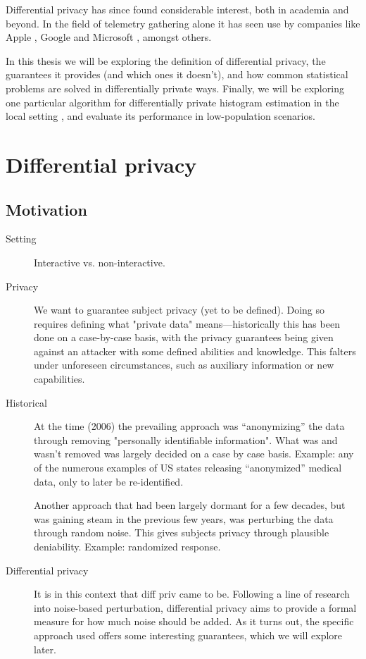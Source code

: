 \documentclass[12pt]{article}
\begin{document}
Differential privacy has since found considerable interest, both in academia and beyond. In the field of telemetry gathering alone it has seen use by companies like Apple \cite{apple_differential}, Google \cite{google_rappor,google_prochlo} and Microsoft \cite{dworketal2006,microsoft_telemetry}, amongst others.

\bigskip

In this thesis we will be exploring the definition of differential privacy, the guarantees it provides (and which ones it doesn't), and how common statistical problems are solved in differentially private ways. Finally, we will be exploring one particular algorithm for differentially private histogram estimation in the local setting \cite{microsoft_telemetry}, and evaluate its performance in low-population scenarios.

\section{Differential privacy \label{sec:diffpriv}}

\subsection{Motivation}

\begin{description}
    \item[Setting] Interactive vs. non-interactive.

    \item[Privacy] We want to guarantee subject privacy (yet to be defined). Doing so requires defining what "private data" means---historically this has been done on a case-by-case basis, with the privacy guarantees being given against an attacker with some defined abilities and knowledge. This falters under unforeseen circumstances, such as auxiliary information or new capabilities.
    
    \item[Historical] At the time (2006) the prevailing approach was ``anonymizing'' the data through removing "personally identifiable information". What was and wasn't removed was largely decided on a case by case basis. Example: any of the numerous examples of US states releasing ``anonymized'' medical data, only to later be re-identified.
    
    Another approach that had been largely dormant for a few decades, but was gaining steam in the previous few years, was perturbing the data through random noise. This gives subjects privacy through plausible deniability. Example: randomized response.
    
    \item[Differential privacy] It is in this context that diff priv came to be. Following a line of research into noise-based perturbation, differential privacy aims to provide a formal measure for how much noise should be added. As it turns out, the specific approach used offers some interesting guarantees, which we will explore later.
\end{description}
\end{document}
